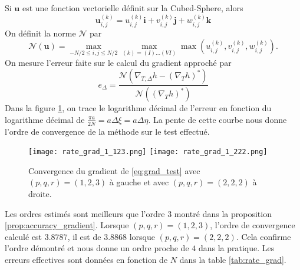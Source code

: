 Si $\mathbf{u}$ est une fonction vectorielle définit sur la Cubed-Sphere, alors
\begin{equation}
\mathbf{u}_{i,j}^{(k)} = u_{i,j}^{(k)} \mathbf{i} + v_{i,j}^{(k)} \mathbf{j} + w_{i,j}^{(k)} \mathbf{k}
\end{equation}
On définit la norme $\mathcal{N}$ par
\begin{equation}
\mathcal{N}(\mathbf{u}) = \max_{-N/2 \leq i,j \leq N/2} \max_{(k) = (I) \ldots (VI)} \max (u_{i,j}^{(k)}, v_{i,j}^{(k)}, w_{i,j}^{(k)}).
\end{equation}
On mesure l'erreur faite sur le calcul du gradient approché par
\begin{equation}
e_{\Delta} = \dfrac{\mathcal{N}\left(\nabla_{T,\Delta}h - \left( \nabla_{T}h \right)^* \right)}{\mathcal{N}\left(\left( \nabla_{T}h \right)^* \right)}
\end{equation}
Dans la figure \ref{fig:rate_grad}, on trace le logarithme décimal de l'erreur en fonction du logarithme décimal de $\frac{\pi a}{2 N} = a \Delta \xi = a \Delta \eta$. La pente de cette courbe nous donne l'ordre de convergence de la méthode sur le test effectué.

\begin{figure}[htbp]
\begin{center}
\texttt{[image: rate\_grad\_1\_123.png]}
\texttt{[image: rate\_grad\_1\_222.png]}
\end{center}
\caption{Convergence du gradient de \eqref{eq:grad_test} avec $(p,q,r)=(1,2,3)$ à gauche et avec $(p,q,r)=(2,2,2)$ à droite.}
\label{fig:rate_grad}
\end{figure}

Les ordres estimés sont meilleurs que l'ordre 3 montré dans la proposition \ref{prop:accuracy_gradient}. Lorsque $(p,q,r)=(1,2,3)$, l'ordre de convergence calculé est $3.8787$, il est de $3.8868$ lorsque $(p,q,r)=(2,2,2)$. Cela confirme l'ordre démontré et nous donne un ordre proche de $4$ dans la pratique. Les erreurs effectives sont données en fonction de $N$ dans la table \ref{tab:rate_grad}.

